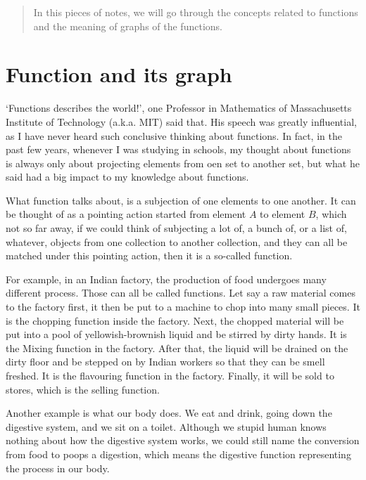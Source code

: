 \documentclass[12pt]{article}
\begin{document}
    \begin{abstract}
        In this pieces of notes, we will go through the concepts related to functions and the meaning of graphs of the functions.
    \end{abstract}

    \tableofcontents

    \newpage

    \section{Function and its graph}

    `Functions describes the world!', one Professor in Mathematics of Massachusetts Institute of Technology (a.k.a. MIT) said that. His speech was greatly influential, as I have never heard such conclusive thinking about functions. In fact, in the past few years, whenever I was studying in schools, my thought about functions is always only about projecting elements from oen set to another set, but what he said had a big impact to my knowledge about functions.

    What function talks about, is a subjection of one elements to one another. It can be thought of as a pointing action started from element $A$ to element $B$, which not so far away, if we could think of subjecting a lot of, a bunch of, or a list of, whatever, objects from one collection to another collection, and they can all be matched under this pointing action, then it is a so-called function.

    For example, in an Indian factory, the production of food undergoes many different process. Those can all be called functions. Let say a raw material comes to the factory first, it then be put to a machine to chop into many small pieces. It is the chopping function inside the factory. Next, the chopped material will be put into a pool of yellowish-brownish liquid and be stirred by dirty hands. It is the Mixing function in the factory. After that, the liquid will be drained on the dirty floor and be stepped on by Indian workers so that they can be smell freshed. It is the flavouring function in the factory. Finally, it will be sold to stores, which is the selling function. 

    Another example is what our body does. We eat and drink, going down the digestive system, and we sit on a toilet. Although we stupid human knows nothing about how the digestive system works, we could still name the conversion from food to poops a digestion, which means the digestive function representing the process in our body.
\end{document}
